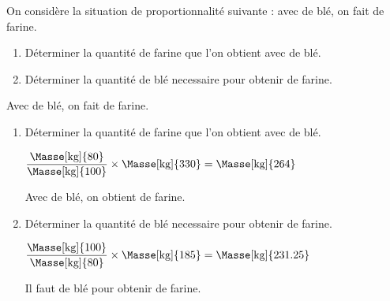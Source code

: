 \begin{exercice}
    On considère la situation de proportionnalité suivante : avec  de blé, on fait  de farine.
    \begin{enumerate}
        \item Déterminer la quantité de farine que l'on obtient avec  de blé.
        \item Déterminer la quantité de blé necessaire pour obtenir  de farine.
    \end{enumerate}
\end{exercice}
\begin{corrige}
    Avec  de blé, on fait  de farine.
    \begin{enumerate}
        \item Déterminer la quantité de farine que l'on obtient avec  de blé.
        
        {\red $\dfrac{\text{\Masse[kg]{80}}}{\text{\Masse[kg]{100}}}\times \text{\Masse[kg]{330}}=\text{\Masse[kg]{264}}$

        Avec  de blé, on obtient  de farine.
        }
        \item Déterminer la quantité de blé necessaire pour obtenir  de farine.

        {\red $\dfrac{\text{\Masse[kg]{100}}}{\text{\Masse[kg]{80}}}\times \text{\Masse[kg]{185}}=\text{\Masse[kg]{231.25}}$

        Il faut  de blé pour obtenir  de farine.
        }        
    \end{enumerate}    
\end{corrige}